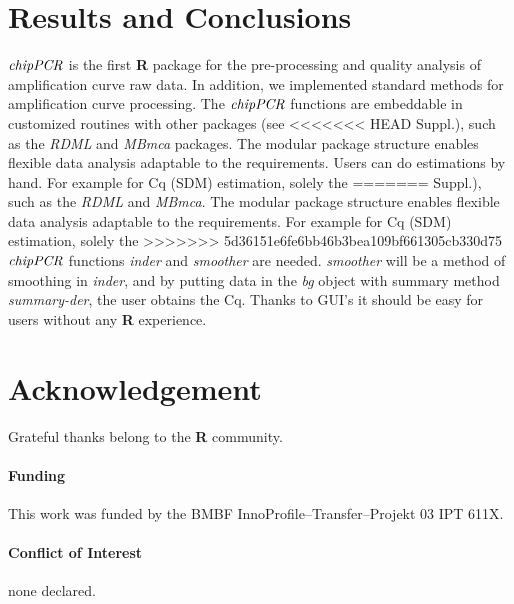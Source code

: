 \documentclass{bioinfo}
\begin{document}
\section{Results and Conclusions}
$\emph{chipPCR}$ is the first \textbf{R} package for the pre-processing and 
quality analysis of amplification curve raw data. In addition, we implemented 
standard methods for amplification curve processing. The $\emph{chipPCR}$ 
functions are embeddable in customized routines with other packages (see 
<<<<<<< HEAD
Suppl.), such as the \emph{RDML} and \emph{MBmca} packages. The modular package 
structure enables flexible data analysis adaptable to the requirements. Users 
can do estimations by hand. For example for Cq (SDM) estimation, solely the 
=======
Suppl.), such as the \emph{RDML} and \emph{MBmca}. The modular package 
structure enables flexible data analysis adaptable to the requirements. 
For example for Cq (SDM) estimation, solely the 
>>>>>>> 5d36151e6fe6bb46b3bea109bf661305cb330d75
$\emph{chipPCR}$ functions \textsl{inder} and \textsl{smoother} are needed. 
\textsl{smoother} will be a method of smoothing in \textsl{inder}, and by 
putting data in the \textsl{bg} object with summary method \textsl{summary-der}, 
the user obtains the Cq. Thanks to GUI's it should be easy for users without any 
\textbf{R} experience.


\section*{Acknowledgement}
\begin{methods}
Grateful thanks belong to the \textbf{R} community.

\paragraph{Funding\textcolon} This work was funded by the BMBF InnoProfile--Transfer--Projekt 03 IPT 611X.

\paragraph{Conflict of Interest\textcolon} none declared.
\end{methods}


%
%
%
%
%
%
%

\end{document}
